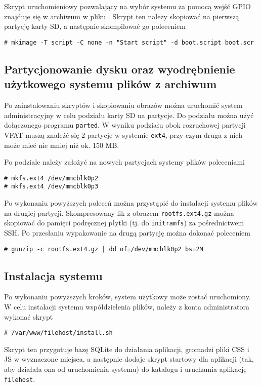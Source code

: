 \documentclass[10pt,a4paper]{article}
\begin{document}
Skrypt uruchomieniowy pozwalający na wybór systemu za pomocą wejść GPIO znajduje się
w archiwum w pliku . Skrypt ten należy skopiować na pierwszą
partycję karty SD, a następnie skompilować go poleceniem
\begin{lstlisting}
# mkimage -T script -C none -n "Start script" -d boot.script boot.scr
\end{lstlisting}

\subsection{Partycjonowanie dysku oraz wyodrębnienie użytkowego systemu plików z archiwum}

Po zainstalowaniu skryptów i skopiowaniu obrazów można uruchomić system administracyjny w celu
podziału karty SD na partycje. Do podziału można użyć dołączonego programu \texttt{parted}.
W wyniku podziału obok rozruchowej partycji VFAT muszą znaleźć się 2 partycje w systemie
\texttt{ext4}, przy czym druga z nich może mieć nie mniej niż ok. 150 MB.

Po podziale należy założyć na nowych partycjach systemy plików poleceniami
\begin{lstlisting}
# mkfs.ext4 /dev/mmcblk0p2
# mkfs.ext4 /dev/mmcblk0p3
\end{lstlisting}
Po wykonaniu powyższych poleceń można przystąpić do instalacji systemu plików na drugiej
partycji. Skompresowany lik z obrazem \texttt{rootfs.ext4.gz} można skopiować do pamięci
podręcznej płytki (tj. do \texttt{initramfs}) za pośrednictwem SSH. Po przesłaniu wypakowanie
na drugą partycję można dokonać poleceniem
\begin{lstlisting}
# gunzip -c rootfs.ext4.gz | dd of=/dev/mmcblk0p2 bs=2M
\end{lstlisting}

\subsection{Instalacja systemu}

Po wykonaniu powyższych kroków, system użytkowy może zostać uruchomiony. W celu instalacji
systemu współdzielenia plików, należy z konta administratora wykonać skrypt
\begin{lstlisting}
# /var/www/filehost/install.sh
\end{lstlisting}
Skrypt ten przygotuje bazę SQLite do działania aplikacji, gromadzi pliki CSS i JS
w wyznaczone miejsca, a następnie dodaje skrypt startowy dla aplikacji (tak, aby działała
ona od uruchomienia systemu) do katalogu  i uruchamia aplikację
\texttt{filehost}.
\end{document}

